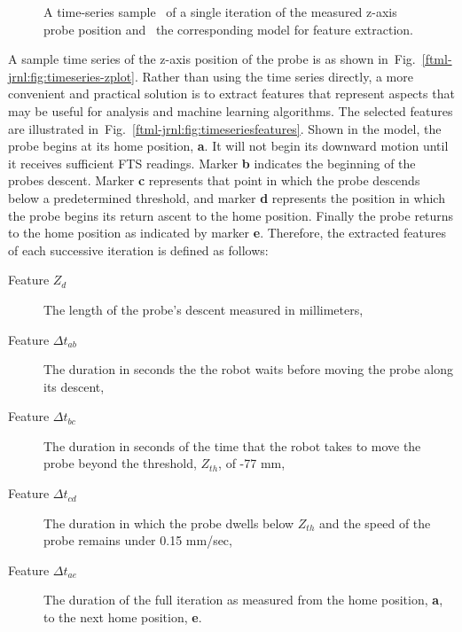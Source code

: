 \begin{figure}[!ht]
	\caption{A time-series sample~\protect{} of a single iteration of the measured z-axis probe position and~\protect{} the corresponding model for feature extraction.}
	\label{ftml-jrnl:fig:timeseries-and-model}
	
\end{figure}	

A sample time series of the z-axis position of the probe is as shown in~Fig.~\ref{ftml-jrnl:fig:timeseries-zplot}.  Rather than using the time series directly, a more convenient and practical solution is to extract features that represent aspects that may be useful for analysis and machine learning algorithms. The selected features are illustrated in~Fig.~\ref{ftml-jrnl:fig:timeseriesfeatures}. Shown in the model, the probe begins at its home position, \textbf{a}.  It will not begin its downward motion until it receives sufficient FTS readings.  Marker \textbf{b} indicates the beginning of the probes descent.  Marker \textbf{c} represents that point in which the probe descends below a predetermined threshold, and marker \textbf{d} represents the position in which the probe begins its return ascent to the home position.  Finally the probe returns to the home position as indicated by marker \textbf{e}.  Therefore, the extracted features of each successive iteration is defined as follows:

\begin{description}
	\item[Feature $Z_d$] The length of the probe's descent measured in millimeters,
	\item[Feature $\Delta{t}_{ab}$] The duration in seconds the the robot waits before moving the probe along its descent,
	\item[Feature $\Delta{t}_{bc}$] The duration in seconds of the time that the robot takes to move the probe beyond the threshold, $Z_{th}$, of -77 mm,
	\item[Feature $\Delta{t}_{cd}$] The duration in which the probe dwells below $Z_{th}$ and the speed of the probe remains under 0.15 mm/sec,
	\item[Feature $\Delta{t}_{ae}$] The duration of the full iteration as measured from the home position, \textbf{a}, to the next home position, \textbf{e}.
\end{description}

